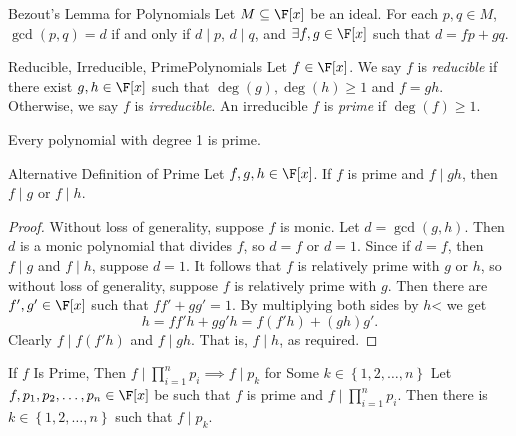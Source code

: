 \documentclass[linearalgebraII]{subfiles}
\begin{document}
    \begin{theorem}{Bezout's Lemma for Polynomials}
        Let $M\subseteq \F[x]$ be an ideal. For each $p,q\in M$, $\gcd(p,q) = d$ if and only if $d\mid p$, $d\mid q$, and $\exists f,g\in \F[x]$ such that $d = fp+gq$.
    \end{theorem}

    \begin{definition}{Reducible, Irreducible, Prime}{Polynomials}
        Let $f\in \F[x]$. We say $f$ is \emph{reducible} if there exist $g,h\in \F[x]$ such that $\deg(g), \deg(h)\geq 1$ and $f=gh$. Otherwise, we say $f$ is \emph{irreducible}. An irreducible $f$ is \emph{prime} if $\deg(f)\geq 1$.
    \end{definition}

    \begin{remark}
        Every polynomial with degree 1 is prime.
    \end{remark}

    \begin{prop}{Alternative Definition of Prime}
        Let $f,g,h\in \F[x]$. If $f$ is prime and $f\mid gh$, then $f\mid g$ or $f\mid h$.
    \end{prop}

    \begin{proof}
        Without loss of generality, suppose $f$ is monic. Let $d=\gcd(g,h)$. Then $d$ is a monic polynomial that divides $f$, so $d=f$ or $d=1$. Since if $d=f$, then $f\mid g$ and $f\mid h$, suppose $d=1$. It follows that $f$ is relatively prime with $g$ or $h$, so without loss of generality, suppose $f$ is relatively prime with $g$. Then there are $f', g'\in \F[x]$ such that $ff'+gg'=1$. By multiplying both sides by $h$< we get
        \begin{equation*}
            h = ff'h + gg'h = f(f'h) + (gh)g'.
        \end{equation*}
        Clearly $f\mid f(f'h)$ and $f\mid gh$. That is, $f\mid h$, as required.
    \end{proof}

    \begin{cor}{If $f$ Is Prime, Then $f\mid \prod^n_{i=1} p_i \implies f\mid p_k$ for Some $k\in \left\lbrace 1, 2, \ldots, n \right\rbrace $}
        Let $f, p_1, p_2, \ldots, p_n\in \F[x]$ be such that $f$ is prime and $f\mid \prod^n_{i=1} p_i$. Then there is $k\in \left\lbrace 1, 2, \ldots, n \right\rbrace$ such that $f\mid p_k$.
    \end{cor}	
\end{document}
